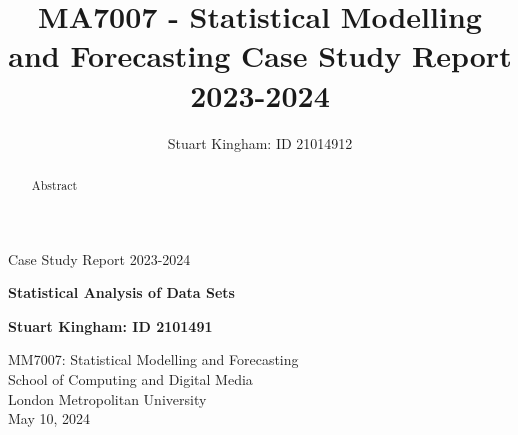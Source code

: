 \documentclass{article}
\title{MA7007 - Statistical Modelling and Forecasting Case Study Report 2023-2024}
\author{Stuart Kingham: ID 21014912}
\begin{document}
\doublespacing



\begin{titlepage}
  \vspace*{\fill}
  \begin{center}
       \vspace*{1cm}

       {\LARGE Case Study Report 2023-2024}

       \vspace*{1cm}
       {\large \textbf{Statistical Analysis of Data Sets}}
       

       \vfill

       \textbf{Stuart Kingham: ID 2101491}

       \vfill
                        
       \vspace{0.8cm}
     

       MM7007: Statistical Modelling and Forecasting\\
       School of Computing and Digital Media\\
       London Metropolitan University\\
       May 10, 2024
            
  \end{center}
  \vspace*{\fill}
\end{titlepage}

\pagebreak

\begin{abstract}
  Abstract
\end{abstract}

\newpage

\singlespacing 
\tableofcontents
\listoffigures
\listoftables
\doublespacing

\newpage











\pagebreak



\pagebreak

\printbibliography

\pagebreak

\appendix

                   
\end{document}
